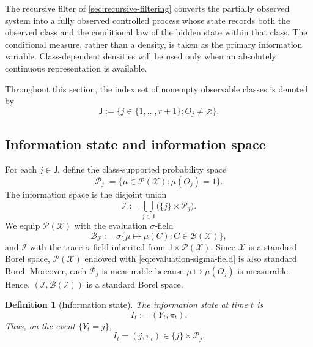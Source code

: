 \documentclass[10pt,twocolumn]{article}
\newtheorem{definition}{Definition}
\theoremstyle{remark}
\newcommand{\B}{\mathcal{B}}
\newcommand{\Pcal}{\mathcal{P}}
\newcommand{\Xcal}{\mathcal{X}}
\newcommand{\Ical}{\mathcal{I}}
\begin{document}
The recursive filter of \cref{sec:recursive-filtering} converts the partially observed system into a fully observed controlled process whose state records both the observed class and the conditional law of the hidden state within that class. The conditional measure, rather than a density, is taken as the primary information variable. Class-dependent densities will be used only when an absolutely continuous representation is available.

Throughout this section, the index set of nonempty observable classes is denoted by
\begin{equation}
	\mathsf J
	:=\{j\in\{1,\ldots,r+1\}:O_j\neq\varnothing\}.
	\label{eq:nonempty-class-index-set}
\end{equation}

\subsection{Information state and information space}
\label{subsec:information-state-space}

For each $j\in\mathsf J$, define the class-supported probability space
\begin{equation}
	\Pcal_j
	:=\bigl\{\mu\in\Pcal(\Xcal):\mu(O_j)=1\bigr\}.
	\label{eq:class-supported-probabilities}
\end{equation}
The information space is the disjoint union
\begin{equation}
	\Ical
	:=\bigcup_{j\in\mathsf J}\bigl(\{j\}\times\Pcal_j\bigr).
	\label{eq:information-space}
\end{equation}
We equip $\Pcal(\Xcal)$ with the evaluation $\sigma$-field
\begin{equation}
	\mathscr B_{\Pcal}
	:=\sigma\bigl\{\mu\mapsto\mu(C):C\in\B(\Xcal)\bigr\},
	\label{eq:evaluation-sigma-field}
\end{equation}
and $\Ical$ with the trace $\sigma$-field inherited from
$\mathsf J\times\Pcal(\Xcal)$. Since $\Xcal$ is a standard Borel space, $\Pcal(\Xcal)$ endowed with \cref{eq:evaluation-sigma-field} is also standard Borel. Moreover, each $\Pcal_j$ is measurable because $\mu\mapsto\mu(O_j)$ is measurable. Hence, $(\Ical,\B(\Ical))$ is a standard Borel space.

\begin{definition}[Information state]
	\label{def:information-state}
	The information state at time $t$ is
	\begin{equation}
		I_t:=(Y_t,\pi_t).
		\label{eq:information-state}
	\end{equation}
	Thus, on the event $\{Y_t=j\}$,
	\[
	I_t=(j,\pi_t)\in\{j\}\times\Pcal_j.
	\]
\end{definition}
\end{document}
